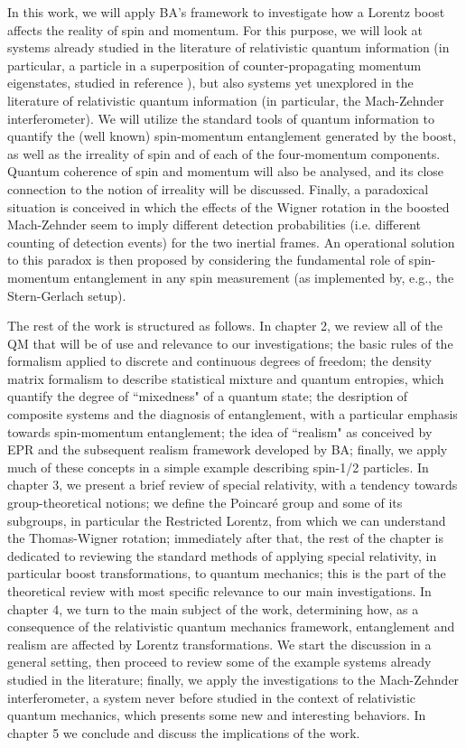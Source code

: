\documentclass[12pt,a4paper,notitlepage]{report}
\begin{document}
In this work, we will apply BA's framework to investigate how a Lorentz boost affects the reality of spin and momentum. For this purpose, we will look at systems already studied in the literature of relativistic quantum information (in particular, a particle in a superposition of counter-propagating momentum eigenstates, studied in reference \cite{dunningham_palge_vedral_2009}), but also systems yet unexplored in the literature of relativistic quantum information (in particular, the Mach-Zehnder interferometer). We will utilize the standard tools of quantum information to quantify the (well known) spin-momentum entanglement generated by the boost, as well as the irreality of spin and of each of the four-momentum components. Quantum coherence of spin and momentum will also be analysed, and its close connection to the notion of irreality will be discussed. Finally, a paradoxical situation is conceived in which the effects of the Wigner rotation in the boosted Mach-Zehnder seem to imply different detection probabilities (i.e. different counting of detection events) for the two inertial frames. An operational solution to this paradox is then proposed by considering the fundamental role of spin-momentum entanglement in any spin measurement (as implemented by, e.g., the Stern-Gerlach setup).


The rest of the work is structured as follows. In chapter 2, we review all of the QM that will be of use and relevance to our investigations; the basic rules of the formalism applied to discrete and continuous degrees of freedom; the density matrix formalism to describe statistical mixture and quantum entropies, which quantify the degree of ``mixedness" of a quantum state; the desription of composite systems and the diagnosis of entanglement, with a particular emphasis towards spin-momentum entanglement; the idea of ``realism" as conceived by EPR and the subsequent realism framework developed by BA; finally, we apply much of these concepts in a simple example describing spin-1/2 particles. In chapter 3, we present a brief review of special relativity, with a tendency towards group-theoretical notions; we define the Poincaré group and some of its subgroups, in particular the Restricted Lorentz, from which we can understand the Thomas-Wigner rotation; immediately after that, the rest of the chapter is dedicated to reviewing the standard methods of applying special relativity, in particular boost transformations, to quantum mechanics; this is the part of the theoretical review with most specific relevance to our main investigations. In chapter 4, we turn to the main subject of the work, determining how, as a consequence of the relativistic quantum mechanics framework, entanglement and realism are affected by Lorentz transformations. We start the discussion in a general setting, then proceed to review some of the example systems already studied in the literature; finally, we apply the investigations to the Mach-Zehnder interferometer, a system never before studied in the context of relativistic quantum mechanics, which presents some new and interesting behaviors. In chapter 5 we conclude and discuss the implications of the work.
\end{document}
